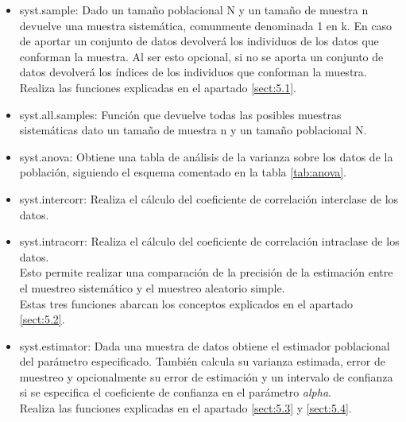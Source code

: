 \begin{itemize}[label=$\bullet$]
    \item syst.sample: Dado un tamaño poblacional N y un tamaño de muestra n devuelve una muestra sistemática, comunmente denominada 1 en k. En caso de aportar un conjunto de datos devolverá los individuos de los datos que conforman la muestra. Al ser esto opcional, si no se aporta un conjunto de datos devolverá los índices de los individuos que conforman la muestra.\\

    Realiza las funciones explicadas en el apartado \ref{sect:5.1}.

    \item syst.all.samples: Función que devuelve todas las posibles muestras sistemáticas dato un tamaño de muestra n y un tamaño poblacional N.

    \item syst.anova: Obtiene una tabla de análisis de la varianza sobre los datos de la población, siguiendo el esquema comentado en la tabla \ref{tab:anova}.

    \item syst.intercorr: Realiza el cálculo del coeficiente de correlación interclase de los datos. 

    \item syst.intracorr: Realiza el cálculo del coeficiente de correlación intraclase de los datos. \\
    
    Esto permite realizar una comparación de la precisión de la estimación entre el muestreo sistemático y el muestreo aleatorio simple.\\

     Estas tres funciones abarcan los conceptos explicados en el apartado \ref{sect:5.2}.

    \item syst.estimator: Dada una muestra de datos obtiene el estimador poblacional del parámetro especificado. También calcula su varianza estimada, error de muestreo y opcionalmente su error de estimación y un intervalo de confianza si se especifica el coeficiente de confianza en el parámetro \textit{alpha}. \\

    Realiza las funciones explicadas en el apartado \ref{sect:5.3} y \ref{sect:5.4}.

    

\end{itemize}